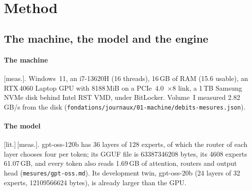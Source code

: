 \documentclass[11pt, a4paper]{article}
\theoremstyle{remark}
\newcommand{\etiq}[1]{\textsf{\scriptsize[#1]}}
\newcommand{\mes}{\etiq{meas.}}
\newcommand{\litt}{\etiq{lit.}}
\newcommand{\fichier}[1]{\textsf{\footnotesize\nolinkurl{#1}}}
\begin{document}
\section{Method}\label{sec:methode}

\subsection{The machine, the model and the engine}\label{sec:moteur}

\paragraph{The machine} \mes. Windows~11, an i7-13620H (16 threads), 16\,GB of RAM (15.6 usable), an RTX\,4060 Laptop GPU with \num{8188}\,MiB on a PCIe~4.0~$\times 8$ link, a 1\,TB Samsung NVMe disk behind Intel RST VMD, under BitLocker. Volume~I measured 2.82\,GB/s from the disk (\fichier{fondations/journaux/01-machine/debits-mesures.json}).

\paragraph{The model} \litt\,\mes. gpt-oss-120b has 36 layers of 128 experts, of which the router of each layer chooses four per token; its GGUF file is \num{63387346208} bytes, its \num{4608} experts 61.07\,GB, and every token also reads 1.69\,GB of attention, routers and output head (\fichier{mesures/gpt-oss.md}). Its development twin, gpt-oss-20b (24 layers of 32 experts, \num{12109566624} bytes), is already larger than the GPU.
\end{document}
